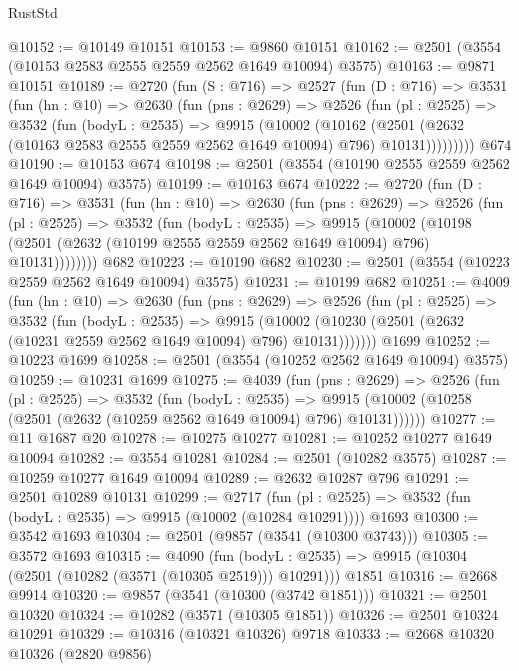 \begin{lexlean}{RustStd}
\begin{coremodule}
@10152 := @10149 @10151
@10153 := @9860 @10151
@10162 := @2501 (@3554 (@10153 @2583 @2555 @2559 @2562 @1649 @10094) @3575)
@10163 := @9871 @10151
@10189 := @2720
    (fun (S : @716) =>
    @2527
      (fun (D : @716) =>
      @3531
        (fun (hn : @10) =>
        @2630
          (fun (pns : @2629) =>
          @2526
            (fun (pl : @2525) =>
            @3532
              (fun (bodyL : @2535) =>
              @9915
                (@10002
                  (@10162
                    (@2501
                      (@2632 (@10163 @2583 @2555 @2559 @2562 @1649 @10094) @796)
                      @10131)))))))))
    @674
@10190 := @10153 @674
@10198 := @2501 (@3554 (@10190 @2555 @2559 @2562 @1649 @10094) @3575)
@10199 := @10163 @674
@10222 := @2720
    (fun (D : @716) =>
    @3531
      (fun (hn : @10) =>
      @2630
        (fun (pns : @2629) =>
        @2526
          (fun (pl : @2525) =>
          @3532
            (fun (bodyL : @2535) =>
            @9915
              (@10002
                (@10198 (@2501 (@2632 (@10199 @2555 @2559 @2562 @1649 @10094) @796) @10131))))))))
    @682
@10223 := @10190 @682
@10230 := @2501 (@3554 (@10223 @2559 @2562 @1649 @10094) @3575)
@10231 := @10199 @682
@10251 := @4009
    (fun (hn : @10) =>
    @2630
      (fun (pns : @2629) =>
      @2526
        (fun (pl : @2525) =>
        @3532
          (fun (bodyL : @2535) =>
          @9915 (@10002 (@10230 (@2501 (@2632 (@10231 @2559 @2562 @1649 @10094) @796) @10131)))))))
    @1699
@10252 := @10223 @1699
@10258 := @2501 (@3554 (@10252 @2562 @1649 @10094) @3575)
@10259 := @10231 @1699
@10275 := @4039
    (fun (pns : @2629) =>
    @2526
      (fun (pl : @2525) =>
      @3532
        (fun (bodyL : @2535) =>
        @9915 (@10002 (@10258 (@2501 (@2632 (@10259 @2562 @1649 @10094) @796) @10131))))))
@10277 := @11 @1687 @20
@10278 := @10275 @10277
@10281 := @10252 @10277 @1649 @10094
@10282 := @3554 @10281
@10284 := @2501 (@10282 @3575)
@10287 := @10259 @10277 @1649 @10094
@10289 := @2632 @10287 @796
@10291 := @2501 @10289 @10131
@10299 := @2717
    (fun (pl : @2525) => @3532 (fun (bodyL : @2535) => @9915 (@10002 (@10284 @10291))))
    @1693
@10300 := @3542 @1693
@10304 := @2501 (@9857 (@3541 (@10300 @3743)))
@10305 := @3572 @1693
@10315 := @4090
    (fun (bodyL : @2535) => @9915 (@10304 (@2501 (@10282 (@3571 (@10305 @2519))) @10291)))
    @1851
@10316 := @2668 @9914
@10320 := @9857 (@3541 (@10300 (@3742 @1851)))
@10321 := @2501 @10320
@10324 := @10282 (@3571 (@10305 @1851))
@10326 := @2501 @10324 @10291
@10329 := @10316 (@10321 @10326) @9718
@10333 := @2668 @10320 @10326 (@2820 @9856)

\end{coremodule}
\end{lexlean}

